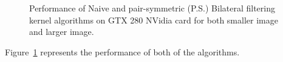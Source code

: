 \documentclass{IEEEtran}
\begin{document}
\begin{figure}[t!] 
\begin{centering} 
\end{centering}
\caption{Performance of Naive and pair-symmetric (P.S.) Bilateral filtering kernel algorithms on GTX 280 NVidia card for both smaller image and larger image.} 
\label{fig:gpuresults} 
\end{figure} 

Figure~\ref{fig:gpuresults} represents the performance of both of the algorithms. 
\end{document}
